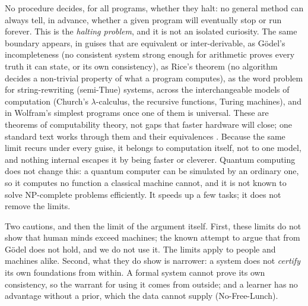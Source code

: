 \documentclass[11pt]{article}
\begin{document}
No procedure decides, for all programs, whether they halt: no general method can always tell, in
advance, whether a given program will eventually stop or run forever. This is the \emph{halting
problem}, and it is not an isolated curiosity. The same boundary appears, in guises that are
equivalent or inter-derivable, as G\"odel's incompleteness (no consistent system strong enough for
arithmetic proves every truth it can state, or its own consistency), as Rice's theorem (no algorithm
decides a non-trivial property of what a program computes), as the word problem for string-rewriting
(semi-Thue) systems, across the interchangeable models of computation (Church's \(\lambda\)-calculus,
the recursive functions, Turing machines), and in Wolfram's simplest programs once one of them is
universal. These are theorems of computability theory, not gaps that faster hardware will close; one standard text works
through them and their equivalences \cite{davis_sigal_weyuker, wolfram2002}. Because the same limit
recurs under every guise, it belongs to computation itself, not to one model, and nothing internal
escapes it by being faster or cleverer. Quantum
computing does not change this: a quantum computer can be simulated by an ordinary one, so it computes
no function a classical machine cannot, and it is not known to solve NP-complete problems
efficiently. It speeds up a few tasks; it does not remove the limits.

Two cautions, and then the limit of the argument itself. First, these limits do not show that human
minds exceed machines; the known attempt to argue that from G\"odel does not hold, and we do not use
it. The limits apply to people and machines alike. Second, what they do show is narrower: a system
does not \emph{certify} its own foundations from within. A formal system cannot prove its own
consistency, so the warrant for using it comes from outside; and a learner has no advantage without a
prior, which the data cannot supply (No-Free-Lunch).
\end{document}
